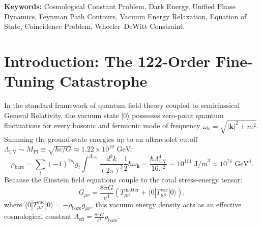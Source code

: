 \documentclass[11pt,a4paper]{article}
\begin{document}
\noindent\textbf{Keywords:} Cosmological Constant Problem, Dark Energy, Unified Phase Dynamics, Feynman Path Contours, Vacuum Energy Relaxation, Equation of State, Coincidence Problem, Wheeler--DeWitt Constraint.

\section{Introduction: The 122-Order Fine-Tuning Catastrophe}
In the standard framework of quantum field theory coupled to semiclassical General Relativity, the vacuum state $|0\rangle$ possesses zero-point quantum fluctuations for every bosonic and fermionic mode of frequency $\omega_{\bm{k}} = \sqrt{|\bm{k}|^2 + m^2}$. Summing the ground-state energies up to an ultraviolet cutoff $\Lambda_{\mathrm{UV}} \sim M_{\mathrm{Pl}} \equiv \sqrt{\hbar c / G} \approx 1.22 \times 10^{19}\text{ GeV}$:
\begin{equation}
\rho_{\mathrm{bare}} = \sum_i (-1)^{2s_i} g_i \int^{\Lambda_{\mathrm{UV}}} \frac{d^3 k}{(2\pi)^3} \frac{1}{2} \hbar \omega_{\bm{k}} = \frac{\hbar \Lambda_{\mathrm{UV}}^4}{16\pi^2} \sim 10^{114}\text{ J/m}^3 \approx 10^{74}\text{ GeV}^4.
\label{eq:bare_zero_point}
\end{equation}
Because the Einstein field equations couple to the total stress-energy tensor:
\begin{equation}
G_{\mu\nu} = \frac{8\pi G}{c^4} \left( T_{\mu\nu}^{\mathrm{matter}} + \langle 0 | T_{\mu\nu}^{\mathrm{vac}} | 0 \rangle \right),
\label{eq:Einstein_vac}
\end{equation}
where $\langle 0 | T_{\mu\nu}^{\mathrm{vac}} | 0 \rangle = -\rho_{\mathrm{bare}} g_{\mu\nu}$, this vacuum energy density acts as an effective cosmological constant $\Lambda_{\mathrm{eff}} = \frac{8\pi G}{c^4} \rho_{\mathrm{bare}}$. 
\end{document}
